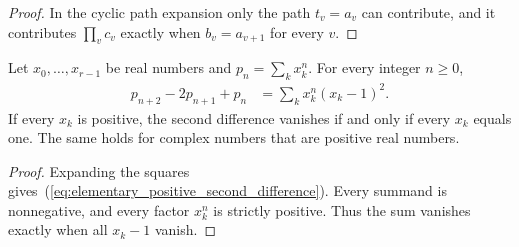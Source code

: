 \begin{proof}
    \leanok
    In the cyclic path expansion only the path $t_v=a_v$ can contribute,
    and it contributes $\prod_vc_v$ exactly when $b_v=a_{v+1}$ for every
    $v$.
\end{proof}

\begin{lemma}
    \label{thm:elementary_positive_power_second_difference}
    \leanok
    Let $x_0,\ldots,x_{r-1}$ be real numbers and $p_n=\sum_k x_k^n$.
    For every integer $n\geq0$,
    \begin{align}
        p_{n+2}-2p_{n+1}+p_n
         & =\sum_k x_k^n(x_k-1)^2.
        \label{eq:elementary_positive_second_difference}
    \end{align}
    If every $x_k$ is positive, the second difference vanishes if and only
    if every $x_k$ equals one. The same holds for complex numbers that are
    positive real numbers.
\end{lemma}

\begin{proof}
    \leanok
    Expanding the squares gives~(\ref{eq:elementary_positive_second_difference}).
    Every summand is nonnegative, and every factor $x_k^n$ is strictly
    positive. Thus the sum vanishes exactly when all $x_k-1$ vanish.
\end{proof}
